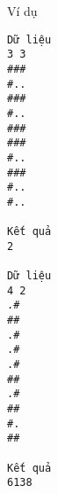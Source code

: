 Ví dụ  
\begin{verbatim}
Dữ liệu
3 3
###
#..
###
#..
###
###
#..
###
#..
#..	

Kết quả
2

Dữ liệu
4 2
.#
##
.#
.#
.#
##
.#
##
#.
##	

Kết quả
6138
\end{verbatim}